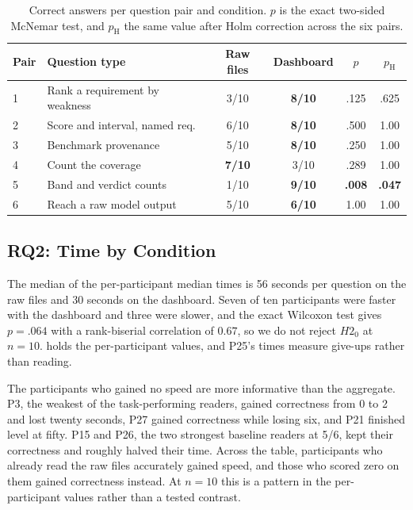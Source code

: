 \documentclass[10pt,conference]{IEEEtran}
\newcommand{\best}[1]{\textbf{#1}}
\newcommand{\tblsetup}{%
  \footnotesize%
  \setlength{\tabcolsep}{3pt}%
  \renewcommand{\arraystretch}{1.02}%
}
\begin{document}
\begin{table}[t]
  \caption{Correct answers per question pair and condition. $p$ is the exact two-sided McNemar test, and $p_{\mathrm{H}}$ the same value after Holm correction across the six pairs.}
  \label{tab:pairs}
  \centering
  \tblsetup
  \begin{tabularx}{\columnwidth}{@{}l X c c c c@{}}
    \toprule
    Pair & Question type & Raw files & Dashboard & $p$ & $p_{\mathrm{H}}$ \\
    \midrule
    1 & Rank a requirement by weakness & 3/10 & \best{8/10} & .125 & .625 \\
    2 & Score and interval, named req. & 6/10 & \best{8/10} & .500 & 1.00 \\
    3 & Benchmark provenance & 5/10 & \best{8/10} & .250 & 1.00 \\
    4 & Count the coverage & \best{7/10} & 3/10 & .289 & 1.00 \\
    5 & Band and verdict counts & 1/10 & \best{9/10} & \best{.008} & \best{.047} \\
    6 & Reach a raw model output & 5/10 & \best{6/10} & 1.00 & 1.00 \\
    \bottomrule
  \end{tabularx}
\end{table}

\subsection{RQ2: Time by Condition}
The median of the per-participant median times is 56 seconds per question on the raw files and 30 seconds on the dashboard.
Seven of ten participants were faster with the dashboard and three were slower, and the exact Wilcoxon test gives $p = .064$ with a rank-biserial correlation of $0.67$, so we do not reject $H2_0$ at $n = 10$.
 holds the per-participant values, and P25's times measure give-ups rather than reading.

The participants who gained no speed are more informative than the aggregate.
P3, the weakest of the task-performing readers, gained correctness from 0 to 2 and lost twenty seconds, P27 gained correctness while losing six, and P21 finished level at fifty.
P15 and P26, the two strongest baseline readers at 5/6, kept their correctness and roughly halved their time.
Across the table, participants who already read the raw files accurately gained speed, and those who scored zero on them gained correctness instead.
At $n = 10$ this is a pattern in the per-participant values rather than a tested contrast.
\end{document}
